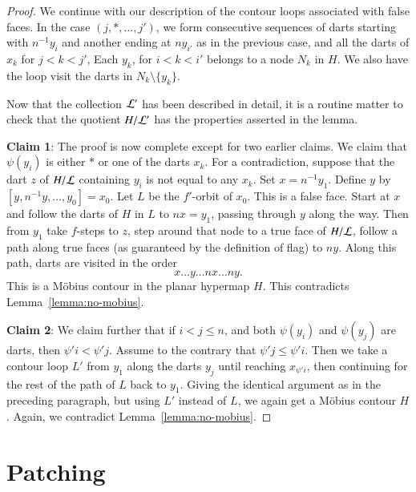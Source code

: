 \begin{proof}
We continue with our description of the contour loops associated
with false faces.
In the case $(j,*,\ldots,j')$, we form consecutive sequences of darts
starting with $n^{-1} y_i$ and another ending at 
$n y_{i'}$ as in the previous case, and
all the darts of $x_k$ for $j<k<j'$, 
Each $y_k$, for $i < k < i'$ belongs to a node $N_k$ in $H$.
We also have the loop visit the darts in $N_k\setminus\{y_k\}$.

Now that the collection ${\cal L}'$ has been described in detail,
it is a routine matter to check that the quotient $H/{\cal L}'$
has the properties asserted in the lemma.

{\bf Claim 1}:
The proof is now complete except for two earlier claims.  We claim
that $\psi(y_i)$ is either $*$ or one of the darts $x_k$. 
For a contradiction, 
suppose that the dart $z$ of $H/{\cal L}$ containing
$y_i$ is not equal to any $x_k$.
Set $x = n^{-1}y_1$.  Define $y$ by
$[y,n^{-1}y,\ldots,y_0] = x_0$.  Let $L$ be the $f'$-orbit
of $x_0$.  This is a false face.
Start at $x$ and follow the darts of $H$ in $L$ 
to $n x = y_1$, passing through $y$ along the way.  Then from
$y_1$ take $f$-steps to $z$, step around that node to a true face
of $H/{\cal L}$,
follow a path along true faces (as guaranteed by the definition
of flag) to $n y$.  Along this path, 
darts are visited in the order
   $$x \ldots y \ldots n x \ldots n y.$$ 
This is a M\"obius contour in 
the planar hypermap $H$.  
This contradicts Lemma~\ref{lemma:no-mobius}.

{\bf Claim 2}:
We claim further that if $i<j\le n$, and both $\psi(y_i)$ and
$\psi(y_j)$ are darts, then $\psi' i < \psi' j$.  Assume to the
contrary that $\psi' j \le \psi' i$.  Then we take a contour loop
$L'$ from $y_1$ along the darts $y_j$ until reaching $x_{\psi' i}$,
then continuing for the rest of the path of $L$ back to $y_1$.
Giving the identical argument as in the preceding paragraph, but
using $L'$ instead of $L$, we again get a M\"obius contour $H$.  
Again, we contradict Lemma~\ref{lemma:no-mobius}.
\end{proof}



\section{Patching}\label{sec:patch}


